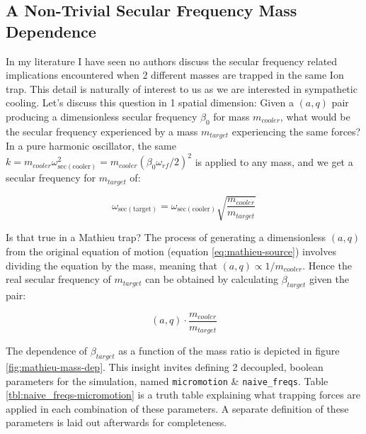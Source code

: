 \subsection{A Non-Trivial Secular Frequency Mass Dependence}\label{ssec:non-trivial-mass-dep}

In my literature I have seen no authors discuss the secular frequency related implications encountered when 2 different masses are trapped in the same Ion trap. This detail is naturally of interest to us as we are interested in sympathetic cooling. Let's discuss this question in 1 spatial dimension: Given a $(a,q)$ pair producing a dimensionless secular frequency $\beta_0$ for mass $m_{cooler}$, what would be the secular frequency experienced by a mass $m_{target}$ experiencing the same forces? In a pure harmonic oscillator, the same $k = m_{cooler} \omega_{\mathrm{sec(cooler)}}^2 = m_{cooler} (\beta_0 \omega_{rf}/2)^2$ is applied to any mass, and we get a secular frequency for $m_{target}$ of:

\begin{equation}
	\omega_\mathrm{sec(target)} = \omega_\mathrm{sec(cooler)}\sqrt{\frac{m_{cooler}}{m_{target}}} 
	\label{eq:mathieu-naive-sec-freq}
\end{equation}

Is that true in a Mathieu trap? The process of generating a dimensionless $(a,q)$ from the original equation of motion (equation \ref{eq:mathieu-source}) involves dividing the equation by the mass, meaning that $(a,q)\propto 1/m_{cooler}$. Hence the real secular frequency of $m_{target}$ can be obtained by calculating $\beta_{target}$ given the pair:

$$(a,q)\cdot \frac{m_{cooler}}{m_{target}}$$

The dependence of $\beta_{target}$ as a function of the mass ratio is depicted in figure \ref{fig:mathieu-mass-dep}. This insight invites defining 2 decoupled, boolean parameters for the simulation, named \texttt{micromotion} \& \texttt{naive\_freqs}. Table \ref{tbl:naive_freqs-micromotion} is a truth table explaining what trapping forces are applied in each combination of these parameters. A separate definition of these parameters is laid out afterwards for completeness.

